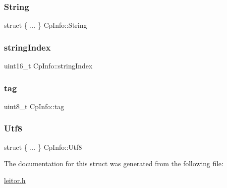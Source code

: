 \mbox{\label{structCpInfo_ac48615bcfbb835d4edd3242ed6e2a172}} 
\subsubsection{\texorpdfstring{String}{String}}
{\footnotesize\ttfamily struct \{ ... \}   Cp\+Info\+::\+String}

\mbox{\label{structCpInfo_af3623a7e7a8ddca66051e5c8284f6787}} 
\subsubsection{\texorpdfstring{string\+Index}{stringIndex}}
{\footnotesize\ttfamily uint16\+\_\+t Cp\+Info\+::string\+Index}

\mbox{\label{structCpInfo_ac20d96c33f871bde2e903708a215a2dc}} 
\subsubsection{\texorpdfstring{tag}{tag}}
{\footnotesize\ttfamily uint8\+\_\+t Cp\+Info\+::tag}

\mbox{\label{structCpInfo_a269d1c1505fdf90973102d733552db05}} 
\subsubsection{\texorpdfstring{Utf8}{Utf8}}
{\footnotesize\ttfamily struct \{ ... \}   Cp\+Info\+::\+Utf8}



The documentation for this struct was generated from the following file\+:\begin{DoxyCompactItemize}
\item 
\hyperlink{leitor_8h}{leitor.\+h}\end{DoxyCompactItemize}
